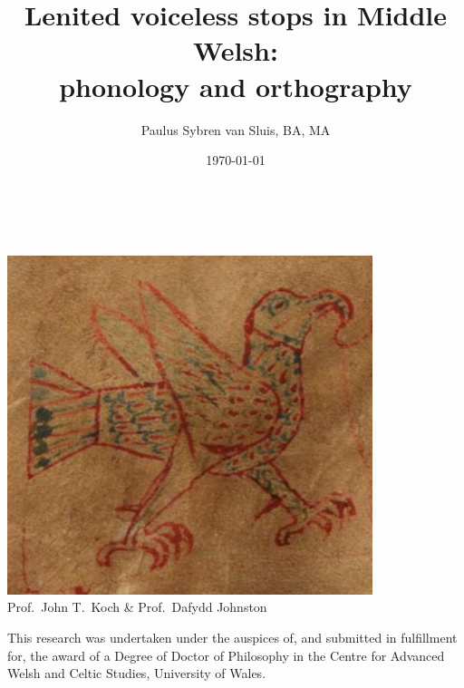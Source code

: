 \title{\LARGE Lenited voiceless stops in Middle Welsh:\\{phonology and orthography}}
\author{Paulus Sybren van Sluis, BA, MA}
\date{\today}


\begin{titlingpage}
\begin{center}
  {\thetitle}\\[3ex]
  {\Large\theauthor}\\[3ex]
  \protect\includegraphics[width=0.8\textwidth]{birdms.png}
  \\[3ex]  
  Prof.\ John T.\ Koch \& Prof.\ Dafydd Johnston
\end{center}
\bigskip
This research was undertaken under the auspices of, and submitted in fulfillment for, the award of a Degree of Doctor of Philosophy in the Centre for Advanced Welsh and Celtic Studies, University of Wales.
\begin{center}
  \vfill
  \thedate
\end{center}

\end{titlingpage}
